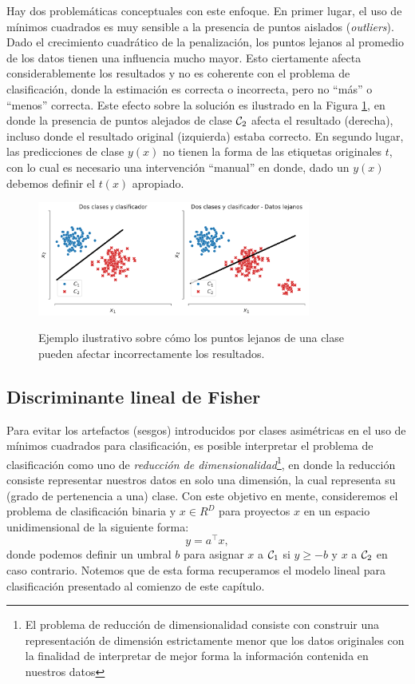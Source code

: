 \begin{remark} Hay dos problemáticas conceptuales con este enfoque. En primer lugar, el uso de mínimos cuadrados es muy sensible a la presencia de puntos aislados (\emph{outliers}). Dado el crecimiento cuadrático de la penalización, los puntos lejanos al promedio de los datos tienen una influencia mucho mayor. Esto ciertamente afecta considerablemente los resultados y no es coherente con el problema de clasificación, donde la estimación es correcta o incorrecta, pero no ``más'' o ``menos'' correcta. Este efecto sobre la solución es ilustrado en la Figura \ref{fig:clasif_mse}, en donde la presencia de puntos alejados de clase ${\mathcal C}_2$ afecta el resultado (derecha), incluso donde el resultado original (izquierda) estaba correcto. En segundo lugar, las predicciones de  clase  $y(x)$ no tienen la forma de las etiquetas originales $t$, con lo cual es necesario una intervención ``manual'' en donde, dado un $y(x)$ debemos definir el $t(x)$ apropiado. 
\end{remark}


\begin{figure}[H]
	\centering
	\includegraphics[width=0.8\textwidth]{img/cap2_dosclases_clasificador.pdf}\\
	\caption{Ejemplo ilustrativo sobre cómo los puntos lejanos de una clase pueden afectar incorrectamente los resultados.}
	\label{fig:clasif_mse}
\end{figure}

\subsection{Discriminante lineal de Fisher}

Para evitar los artefactos (sesgos) introducidos por clases  asimétricas en el uso de mínimos cuadrados para clasificación, es posible interpretar el problema de clasificación como uno de \emph{reducción de dimensionalidad}\footnote{El problema de reducción de dimensionalidad consiste con construir una representación de dimensión estrictamente menor que los datos originales con la finalidad de interpretar de mejor forma la información contenida en nuestros datos}, en donde la reducción consiste representar nuestros datos  en solo una dimensión, la cual representa su (grado de pertenencia a una) clase. Con este objetivo en mente, consideremos el problema de clasificación binaria y $x\in R^D$ para proyectos $x$ en un espacio unidimensional de la  siguiente forma:
\begin{equation}
	y = a^\top x,
\end{equation}
donde podemos definir un umbral $b$ para asignar $x$ a ${\mathcal C}_1$ si $y\geq-b$ y $x$ a ${\mathcal C}_2$ en caso contrario. Notemos que de esta forma recuperamos el modelo lineal para clasificación presentado al comienzo de este capítulo.

